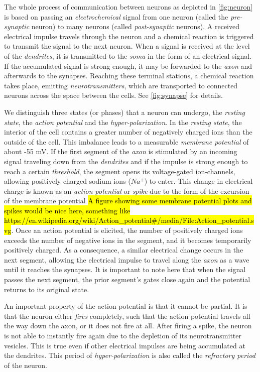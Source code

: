 The whole process of communication between neurons as depicted in \autoref{fig:neuron} is based on passing an \emph{electrochemical} signal from one neuron (called the \emph{pre-synaptic} neuron) to many neurons (called \emph{post-synaptic} neurons). A received electrical impulse travels through the neuron and a chemical reaction is triggered to transmit the signal to the next neuron. When a signal is received at the level of the \emph{dendrites}, it is transmitted to the \emph{soma} in the form of an electrical signal. If the accumulated signal is strong enough, it may be forwarded to the \emph{axon} and afterwards to the synapses. Reaching these terminal stations, a chemical reaction takes place, emitting \emph{neurotransmitters}, which are transported to connected neurons across the space between the cells. See \autoref{fig:synapse} for details.

We distinguish three states (or phases) that a neuron can undergo, the \emph{resting state}, the \emph{action potential} and the \emph{hyper-polarization}. In the \emph{resting state}, the interior of the cell contains a greater number of negatively charged ions than the outside of the cell. This imbalance leads to a measurable \emph{membrane potential} of about -55 mV. If the first segment of the \emph{axon} is stimulated by an incoming signal traveling down from the \emph{dendrites} and if the impulse is strong enough to reach a certain \emph{threshold}, the segment opens its voltage-gated ion-channels, allowing positively charged sodium ions ($Na^{+}$) to enter. This change in electrical charge is known as an \emph{action potential} or \emph{spike} due to the form of the excursion of the membrane potential \hl{A figure showing some membrane potential plots and spikes would be nice here, something like https://en.wikipedia.org/wiki/Action\_potential\#/media/File:Action\_potential.svg}. Once an action potential is elicited, the number of positively charged ions exceeds the number of negative ions in the segment, and it becomes temporarily positively charged. As a consequence, a similar electrical change occurs in the next segment, allowing the electrical impulse to travel along the \emph{axon} as a wave until it reaches the synapses. It is important to note here that when the signal passes the next segment, the prior segment's gates close again and the potential returns to its original state.

An important property of the action potential is that it cannot be partial. It is that the neuron either \emph{fires} completely, such that the action potential travels all the way down the axon, or it does not fire at all. After firing a spike, the neuron is not able to instantly fire again due to the depletion of its neurotransmitter vesicles. This is true even if other electrical impulses are being accumulated at the dendrites. This period of \emph{hyper-polarization} is also called the \emph{refractory period} of the neuron.

